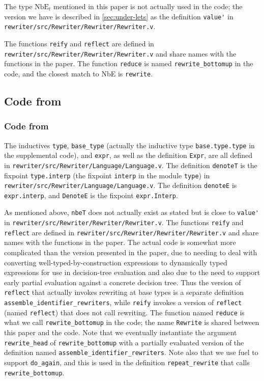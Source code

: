 \documentclass[a4paper,USenglish,cleveref,autoref,thm-restate]{lipics-v2021}
\begin{document}
The type $\text{NbE}_t$ mentioned in this paper is not actually used in the code; the version we have is described in \autoref{sec:under-lets} as the definition \verb|value'| in \texttt{rewriter/src/Rewriter/Rewriter/Rewriter.v}.

The functions \verb|reify| and \verb|reflect| are defined in \texttt{rewriter/src/Rewriter/Rewriter/Rewriter.v} and share names with the functions in the paper.
The function \texttt{reduce} is named \verb|rewrite_bottomup| in the code, and the closest match to NbE is \verb|rewrite|.

\subsection{Code from }

\subsubsection{Code from }

The inductives \verb|type|, \verb|base_type| (actually the inductive type \verb|base.type.type| in the supplemental code), and \verb|expr|, as well as the definition \verb|Expr|, are all defined in \texttt{rewriter/src/Rewriter/Language/Language.v}.
The definition \verb|denoteT| is the fixpoint \verb|type.interp| (the fixpoint \verb|interp| in the module \verb|type|) in \texttt{rewriter/src/Rewriter/Language/Language.v}.
The definition \verb|denoteE| is \verb|expr.interp|, and \verb|DenoteE| is the fixpoint \verb|expr.Interp|.

As mentioned above, \verb|nbeT| does not actually exist as stated but is close to \verb|value'| in \texttt{rewriter/src/Rewriter/Rewriter/Rewriter.v}.
The functions \verb|reify| and \verb|reflect| are defined in \texttt{rewriter/src/Rewriter/Rewriter/Rewriter.v} and share names with the functions in the paper.
The actual code is somewhat more complicated than the version presented in the paper, due to needing to deal with converting well-typed-by-construction expressions to dynamically typed expressions for use in decision-tree evaluation and also due to the need to support early partial evaluation against a concrete decision tree.
Thus the version of \verb|reflect| that actually invokes rewriting at base types is a separate definition \verb|assemble_identifier_rewriters|, while \verb|reify| invokes a version of \verb|reflect| (named \verb|reflect|) that does not call rewriting.
The function named \texttt{reduce} is what we call \verb|rewrite_bottomup| in the code; the name \verb|Rewrite| is shared between this paper and the code.
Note that we eventually instantiate the argument \verb|rewrite_head| of \verb|rewrite_bottomup| with a partially evaluated version of the definition named \verb|assemble_identifier_rewriters|.
Note also that we use fuel to support \verb|do_again|, and this is used in the definition \verb|repeat_rewrite| that calls \verb|rewrite_bottomup|.
\end{document}

